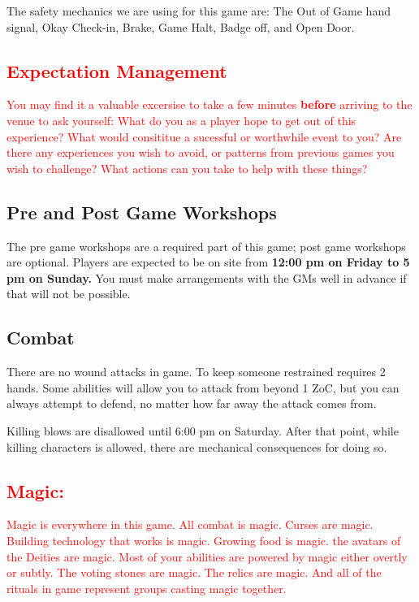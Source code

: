 \documentclass[sheet]{GL2020}
\begin{document}
The safety mechanics we are using for this game are: The Out of Game hand signal, Okay Check-in, Brake, Game Halt, Badge off, and Open Door.

\textcolor{red}{\subsection{Expectation Management}}
\textcolor{red}{You may find it a valuable excersise to take a few minutes \textbf{before} arriving to the venue to ask yourself: What do you as a player hope to get out of this experience? What would consititue a sucessful or worthwhile event to you? Are there any experiences you wish to avoid, or patterns from previous games you wish to challenge? What actions can you take to help with these things?}

\subsection{Pre and Post Game Workshops}
The pre game workshops are a required part of this game; post game workshops are optional. Players are expected to be on site from \textbf{12:00 pm on Friday to 5 pm on Sunday.} You must make arrangements with the GMs well in advance if that will not be possible.

\subsection{Combat}
There are no wound attacks in game. To keep someone restrained requires 2 hands. Some abilities will allow you to attack from beyond 1 ZoC, but you can always attempt to defend, no matter how far away the attack comes from.

Killing blows are disallowed until 6:00 pm on Saturday. After that point, while killing characters is allowed, there are mechanical consequences for doing so.

\textcolor{red}{\subsection{Magic:}}
\textcolor{red}{Magic is everywhere in this game. All combat is magic. Curses are magic. Building technology that works is magic. Growing food is magic. the avatars of the Deities are magic. Most of your abilities are powered by magic either overtly or subtly. The voting stones are magic. The relics are magic. And all of the rituals in game represent groups casting magic together.}
\end{document}
